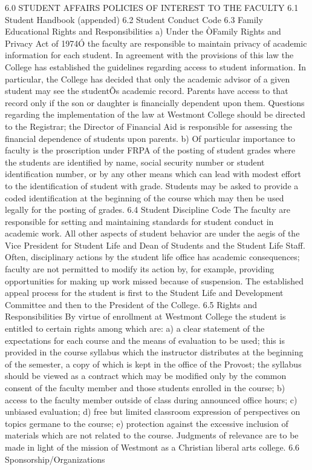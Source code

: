 \documentclass[letterpaper, 11pt]{article}
\begin{document}
	6.0 STUDENT AFFAIRS POLICIES OF INTEREST TO THE FACULTY
	6.1 Student Handbook (appended)
	6.2 Student Conduct Code
	6.3 Family Educational Rights and Responsibilities
	a) Under the ÒFamily Rights and Privacy Act of 1974Ó the faculty are responsible to maintain privacy of academic information for each student.  In agreement with the provisions of this law the College has established the guidelines regarding access to student information.  In particular, the College has decided that only the academic advisor of a given student may see the studentÕs academic record.  Parents have access to that record only if the son or daughter is financially dependent upon them.  Questions regarding the implementation of the law at Westmont College should be directed to the Registrar; the Director of Financial Aid is responsible for assessing the financial dependence of students upon parents.
	b) Of particular importance to faculty is the proscription under FRPA of the posting of student grades where the students are identified by name, social security number or student identification number, or by any other means which can lead with modest effort to the identification of student with grade.  Students may be asked to provide a coded identification at the beginning of the course which may then be used legally for the posting of grades.
	6.4 Student Discipline Code
	The faculty are responsible for setting and maintaining standards for student conduct in academic work.  All other aspects of student behavior are under the aegis of the Vice President for Student Life and Dean of Students and the Student Life Staff.  Often, disciplinary actions by the student life office has academic consequences; faculty are not permitted to modify its action by, for example, providing opportunities for making up work missed because of suspension.  The established appeal process for the student is first to the Student Life and Development Committee and then to the President of the College.
	6.5 Rights and Responsibilities
	By virtue of enrollment at Westmont College the student is entitled to certain rights among which are:
	a) a clear statement of the expectations for each course and the means of evaluation to be used; this is provided in the course syllabus which the instructor distributes at the beginning of the semester, a copy of which is kept in the office of the Provost; the syllabus should be viewed as a contract which may be modified only by the common consent of the faculty member and those students enrolled in the course;
	b) access to the faculty member outside of class during announced office hours;
	c) unbiased evaluation;
	d) free but limited classroom expression of perspectives on topics germane to the course;
	e) protection against the excessive inclusion of materials which are not related to the course. Judgments of relevance are to be made in light of the mission of Westmont as a Christian liberal arts college.
	6.6 Sponsorship/Organizations
\end{document}
